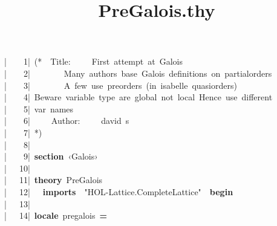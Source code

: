 \documentclass{article}
\title{PreGalois.thy}
\newcommand{\syntaxNULL}[1]{\textcolor[rgb]{0.0,0.0,0.0}{#1}}
\newcommand{\syntaxCOMMENTA}[1]{\textcolor[rgb]{0.8,0.0,0.0}{#1}}
\newcommand{\syntaxCOMMENTC}[1]{\textcolor[rgb]{0.4,0.0,0.8}{#1}}
\newcommand{\syntaxKEYWORDA}[1]{\textcolor[rgb]{0.0,0.4,0.6}{\textbf{#1}}}
\newcommand{\syntaxKEYWORDB}[1]{\textcolor[rgb]{0.0,0.6,0.4}{\textbf{#1}}}
\newcommand{\syntaxLITERALA}[1]{\textcolor[rgb]{1.0,0.0,0.8}{#1}}
\newcommand{\syntaxOPERATOR}[1]{\textcolor[rgb]{0.0,0.0,0.0}{\textbf{#1}}}
\newcommand{\syntaxNULL}[1]{\textcolor[rgb]{0.0,0.0,0.0}{#1}}
\newcommand{\syntaxCOMMENTA}[1]{\textcolor[rgb]{0.8,0.0,0.0}{#1}}
\newcommand{\syntaxCOMMENTC}[1]{\textcolor[rgb]{0.4,0.0,0.8}{#1}}
\newcommand{\syntaxKEYWORDA}[1]{\textcolor[rgb]{0.0,0.4,0.6}{\textbf{#1}}}
\newcommand{\syntaxKEYWORDB}[1]{\textcolor[rgb]{0.0,0.6,0.4}{\textbf{#1}}}
\newcommand{\syntaxLITERALA}[1]{\textcolor[rgb]{1.0,0.0,0.8}{#1}}
\newcommand{\syntaxOPERATOR}[1]{\textcolor[rgb]{0.0,0.0,0.0}{\textbf{#1}}}
\newcommand{\syntaxNULL}[1]{\textcolor[rgb]{0.0,0.0,0.0}{#1}}
\newcommand{\syntaxCOMMENTA}[1]{\textcolor[rgb]{0.8,0.0,0.0}{#1}}
\newcommand{\syntaxCOMMENTC}[1]{\textcolor[rgb]{0.4,0.0,0.8}{#1}}
\newcommand{\syntaxKEYWORDA}[1]{\textcolor[rgb]{0.0,0.4,0.6}{\textbf{#1}}}
\newcommand{\syntaxKEYWORDB}[1]{\textcolor[rgb]{0.0,0.6,0.4}{\textbf{#1}}}
\newcommand{\syntaxLITERALA}[1]{\textcolor[rgb]{1.0,0.0,0.8}{#1}}
\newcommand{\syntaxOPERATOR}[1]{\textcolor[rgb]{0.0,0.0,0.0}{\textbf{#1}}}
\newcommand{\syntaxNULL}[1]{\textcolor[rgb]{0.0,0.0,0.0}{\textbf{#1}}}
\newcommand{\syntaxCOMMENTA}[1]{\textcolor[rgb]{0.8,0.0,0.0}{\textbf{#1}}}
\newcommand{\syntaxCOMMENTC}[1]{\textcolor[rgb]{0.4,0.0,0.8}{\textbf{#1}}}
\newcommand{\syntaxKEYWORDA}[1]{\textcolor[rgb]{0.0,0.4,0.6}{#1}}
\newcommand{\syntaxKEYWORDB}[1]{\textcolor[rgb]{0.0,0.6,0.4}{#1}}
\newcommand{\syntaxLITERALA}[1]{\textcolor[rgb]{1.0,0.0,0.8}{\textbf{#1}}}
\newcommand{\syntaxOPERATOR}[1]{\textcolor[rgb]{0.0,0.0,0.0}{#1}}
\newcommand{\syntaxNULL}[1]{\textcolor[rgb]{0.0,0.0,0.0}{#1}}
\newcommand{\syntaxCOMMENTA}[1]{\textcolor[rgb]{0.8,0.0,0.0}{#1}}
\newcommand{\syntaxCOMMENTC}[1]{\textcolor[rgb]{0.4,0.0,0.8}{#1}}
\newcommand{\syntaxKEYWORDA}[1]{\textcolor[rgb]{0.0,0.4,0.6}{\textbf{#1}}}
\newcommand{\syntaxKEYWORDB}[1]{\textcolor[rgb]{0.0,0.6,0.4}{\textbf{#1}}}
\newcommand{\syntaxLITERALA}[1]{\textcolor[rgb]{1.0,0.0,0.8}{#1}}
\newcommand{\syntaxOPERATOR}[1]{\textcolor[rgb]{0.0,0.0,0.0}{\textbf{#1}}}
\newcommand{\syntaxNULL}[1]{\textcolor[rgb]{0.0,0.0,0.0}{#1}}
\newcommand{\syntaxCOMMENTA}[1]{\textcolor[rgb]{0.8,0.0,0.0}{#1}}
\newcommand{\syntaxCOMMENTC}[1]{\textcolor[rgb]{0.4,0.0,0.8}{#1}}
\newcommand{\syntaxKEYWORDA}[1]{\textcolor[rgb]{0.0,0.4,0.6}{\textbf{#1}}}
\newcommand{\syntaxKEYWORDB}[1]{\textcolor[rgb]{0.0,0.6,0.4}{\textbf{#1}}}
\newcommand{\syntaxLITERALA}[1]{\textcolor[rgb]{1.0,0.0,0.8}{#1}}
\newcommand{\syntaxOPERATOR}[1]{\textcolor[rgb]{0.0,0.0,0.0}{\textbf{#1}}}
\newcommand{\syntaxNULL}[1]{\textcolor[rgb]{1.0,1.0,1.0}{#1}}
\newcommand{\syntaxCOMMENTA}[1]{\textcolor[rgb]{0.0,0.0,0.0}{#1}}
\newcommand{\syntaxCOMMENTC}[1]{\textcolor[rgb]{0.0,0.0,0.0}{#1}}
\newcommand{\syntaxKEYWORDA}[1]{\textcolor[rgb]{0.0,0.0,0.0}{#1}}
\newcommand{\syntaxKEYWORDB}[1]{\textcolor[rgb]{0.0,0.0,0.0}{#1}}
\newcommand{\gutter}[1]{\textcolor[rgb]{0,0,0}{{|}#1}}
\newcommand{\gutterH}[1]{\textcolor[rgb]{1,0,0}{{|}#1}}
\begin{document}
\pagecolor{bgcolor}
\noindent
\ttfamily
\syntaxNULL{}\gutter{\ \ \ \ 1{|}\ }\syntaxCOMMENTA{(*{\ }{\ }Title:{\ }{\ }{\ }{\ }{\ }First{\ }attempt{\ }at{\ }Galois}\hspace*{\fill}\\
\gutter{\ \ \ \ 2{|}\ }\syntaxCOMMENTA{{\ }{\ }{\ }{\ }{\ }{\ }{\ }Many{\ }authors{\ }base{\ }Galois{\ }definitions{\ }on{\ }partial\usebox{\underscorebox}orders}\hspace*{\fill}\\
\gutter{\ \ \ \ 3{|}\ }\syntaxCOMMENTA{{\ }{\ }{\ }{\ }{\ }{\ }{\ }A{\ }few{\ }use{\ }pre\usebox{\underscorebox}orders{\ }(in{\ }isabelle{\ }quasi\usebox{\underscorebox}orders)}\hspace*{\fill}\\
\gutter{\ \ \ \ 4{|}\ }\syntaxCOMMENTA{Beware{\ }variable{\ }type{\ }are{\ }global{\ }not{\ }local{\ }Hence{\ }use{\ }different{\ }}\hspace*{\fill}\\
\gutterH{\ \ \ \ 5{|}\ }\syntaxCOMMENTA{var{\ }names}\hspace*{\fill}\\
\gutter{\ \ \ \ 6{|}\ }\syntaxCOMMENTA{{\ }{\ }{\ }{\ }Author:{\ }{\ }{\ }{\ }{\ }david{\ }s}\hspace*{\fill}\\
\gutter{\ \ \ \ 7{|}\ }\syntaxCOMMENTA{*)}\hspace*{\fill}\\
\gutter{\ \ \ \ 8{|}\ }\hspace*{\fill}\\
\gutter{\ \ \ \ 9{|}\ }\syntaxKEYWORDA{section}{\ }\syntaxCOMMENTC{‹}\syntaxCOMMENTC{G}\syntaxCOMMENTC{a}\syntaxCOMMENTC{l}\syntaxCOMMENTC{o}\syntaxCOMMENTC{i}\syntaxCOMMENTC{s}\syntaxCOMMENTC{›}\hspace*{\fill}\\
\gutterH{\ \ \ 10{|}\ }\hspace*{\fill}\\
\gutter{\ \ \ 11{|}\ }\syntaxKEYWORDA{theory}{\ }PreGalois\hspace*{\fill}\\
\gutter{\ \ \ 12{|}\ }{\ }{\ }\syntaxKEYWORDB{imports}{\ }{\ }\syntaxLITERALA{"HOL{-}Lattice.CompleteLattice"}{\ }{\ }\syntaxKEYWORDB{begin}\hspace*{\fill}\\
\gutter{\ \ \ 13{|}\ }\hspace*{\fill}\\
\gutter{\ \ \ 14{|}\ }\syntaxKEYWORDA{locale}{\ }pre\usebox{\underscorebox}galois{\ }\syntaxOPERATOR{=}\hspace*{\fill}\\
\end{document}
